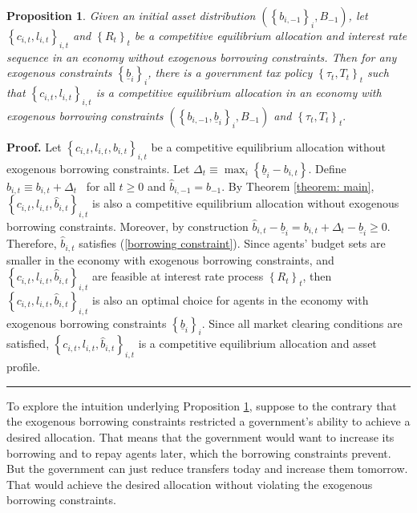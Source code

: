 \documentclass[thmsb,11pt]{article}
\newtheorem{proposition}{Proposition}
\newenvironment{proof}[1][Proof]{\noindent \textbf{#1.} }{\  \rule{0.5em}{0.5em}}
\begin{document}
\begin{proposition}
\label{thm:borrowing_constraint}  Given an initial asset distribution $\left(
\left\{ b_{i,-1}\right\} _{i},B_{-1}\right)$, let $\left\{ c_{i,t},l_{i,t}\right\} _{i,t}$ and $\left\{ R_{t}\right\}_t $ be a competitive
equilibrium allocation and interest rate sequence in an economy without
exogenous borrowing constraints. Then for any exogenous
constraints $\left\{ \underline{b}_{i}\right\} _{i}$, there is a government
tax policy $\left\{ \tau _{t},T_{t}\right\} _{t}$ such that $\left\{
c_{i,t},l_{i,t}\right\} _{i,t}$ is a competitive equilibrium
allocation in an economy with exogenous borrowing constraints $\left(
\left\{ b_{i,-1},\underline{b}_{i}\right\} _{i},B_{-1}\right) $ and $\left\{
\tau _{t},T_{t}\right\} _{t}.$
\end{proposition}

\begin{proof}
Let $\left\{ c_{i,t},l_{i,t},b_{i,t}\right\} _{i,t}$
be a competitive equilibrium allocation without exogenous borrowing
constraints. Let $\Delta _{t}\equiv \max_{i}\left\{ \underline{b}%
_{i}-b_{i,t}\right\} .$ Define $\hat{b}_{i,t}\equiv b_{i,t}+\Delta _{t}$ \ for all $t\geq 0$ and $\hat{b}_{i,-1}=b_{-1}.$ By Theorem %
\ref{theorem: main}, $\left\{ c_{i,t},l_{i,t},\hat{b}%
_{i,t}\right\} _{i,t}$ is also a competitive equilibrium allocation without
exogenous borrowing constraints. Moreover, by construction $\hat{b}_{i,t}-%
\underline{b}_{i}=b_{i,t}+\Delta _{t}-\underline{b}_{i}\geq 0$.
Therefore, $\hat{b}_{i,t}$ satisfies (\ref{borrowing constraint}). Since
agents' budget sets are smaller in the economy with exogenous borrowing
constraints, and $\left\{ c_{i,t},l_{i,t},\hat{b}%
_{i,t}\right\} _{i,t}$ are feasible at interest rate process $\left\{
R_{t}\right\} _{t}$, then $\left\{ c_{i,t},l_{i,t},%
\hat{b}_{i,t}\right\} _{i,t}$ is also an optimal choice for agents in the
economy with exogenous borrowing constraints $\left\{ \underline{b}%
_{i}\right\} _{i}.$ Since all market clearing conditions are satisfied, $%
\left\{ c_{i,t},l_{i,t},\hat{b}_{i,t}\right\} _{i,t}$ is a
competitive equilibrium allocation and asset profile.
\end{proof}

To explore the intuition underlying Proposition \ref{thm:borrowing_constraint}, suppose to the contrary that the exogenous borrowing constraints  restricted a  government's
 ability to achieve a desired allocation. That  means that
the government would want to increase  its borrowing
and to repay agents later, which the borrowing constraints prevent. But the government can just reduce
transfers today and increase them tomorrow. That would  achieve the  desired  allocation
without violating the exogenous borrowing constraints.
\end{document}
